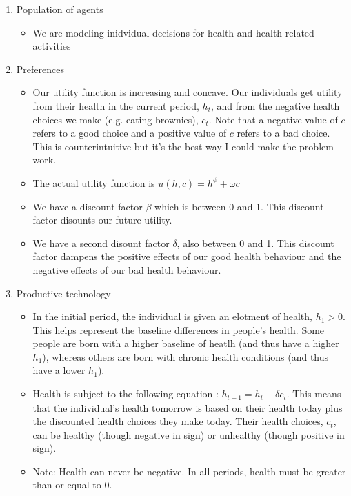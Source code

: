 \documentclass{article}[12pt]
\begin{document}
\begin{enumerate}
    \item Population of agents
    \begin{itemize}
        \item We are modeling inidvidual decisions for health and health related activities
    \end{itemize}
    \item Preferences
    \begin{itemize}
        \item Our utility function is increasing and concave.  Our individuals get utility from their health in the current period, $h_t$, and from the negative health choices we make (e.g. eating brownies), $c_t$.  Note that a negative value of $c$ refers to a good choice and a positive value of $c$ refers to a bad choice.  This is counterintuitive but it's the best way I could make the problem work.
        \item The actual utility function is $u(h, c) = h ^ \phi + \omega  c$
        \item We have a discount factor $\beta$ which is between 0 and 1.  This discount factor disounts our future utility.
        \item We have a second disount factor $\delta$, also between 0 and 1.  This discount factor dampens the positive effects of our good health behaviour and the negative effects of our bad health behaviour.
    \end{itemize}
    \item Productive technology
    \begin{itemize}
        \item In the initial period, the individual is given an elotment of health, $h_1 > 0$.  This helps represent the baseline differences in people's health.  Some people are born with a higher baseline of heatlh (and thus have a higher $h_1$), whereas others are born with chronic health conditions (and thus have a lower $h_1$).
        \item Health is subject to the following equation : $h_{t+1} = h_t - \delta c_t$.  This means that the individual's health tomorrow is based on their health today plus the discounted health choices they make today.  Their health choices, $c_t$, can be healthy (though negative in sign) or unhealthy (though positive in sign).
        \item Note: Health can never be negative.  In all periods, health must be greater than or equal to 0.
    \end{itemize}

\end{enumerate}
\end{document}
